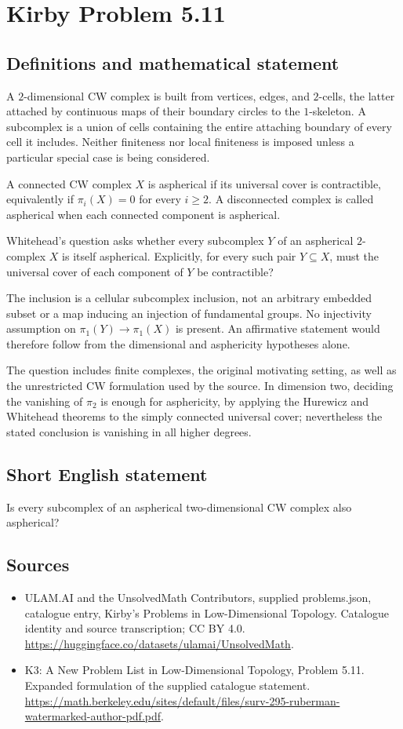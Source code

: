 \documentclass[11pt,a4paper]{article}
\begin{document}
\section*{Kirby Problem 5.11}\label{statement}

\subsection{Definitions and mathematical statement}
A $2$-dimensional CW complex is built from vertices, edges,
and $2$-cells, the latter attached by continuous maps of their
boundary circles to the $1$-skeleton. A subcomplex is a union
of cells containing the entire attaching boundary of every cell
it includes. Neither finiteness nor local finiteness is imposed
unless a particular special case is being considered.

A connected CW complex $X$ is aspherical if its universal
cover is contractible, equivalently if $\pi_i(X)=0$ for every
$i\ge2$. A disconnected complex is called aspherical when
each connected component is aspherical.

Whitehead's question asks whether every subcomplex $Y$ of an
aspherical $2$-complex $X$ is itself aspherical. Explicitly,
for every such pair $Y\subseteq X$, must the universal cover
of each component of $Y$ be contractible?

The inclusion is a cellular subcomplex inclusion, not an
arbitrary embedded subset or a map inducing an injection of
fundamental groups. No injectivity assumption on
$\pi_1(Y)\to\pi_1(X)$ is present. An affirmative statement
would therefore follow from the dimensional and asphericity
hypotheses alone.

The question includes finite complexes, the original motivating
setting, as well as the unrestricted CW formulation used by
the source. In dimension two, deciding the vanishing of
$\pi_2$ is enough for asphericity, by applying the Hurewicz
and Whitehead theorems to the simply connected universal
cover; nevertheless the stated conclusion is vanishing in
all higher degrees.
\subsection{Short English statement}
Is every subcomplex of an aspherical two-dimensional CW complex also aspherical?
\subsection{Sources}
\begin{itemize}
\item[S1] ULAM.AI and the UnsolvedMath Contributors, supplied problems.json, catalogue entry, Kirby's Problems in Low-Dimensional Topology. Catalogue identity and source transcription; CC BY 4.0.
\url{https://huggingface.co/datasets/ulamai/UnsolvedMath}.
\item[S2] K3: A New Problem List in Low-Dimensional Topology, Problem 5.11. Expanded formulation of the supplied catalogue statement.
\url{https://math.berkeley.edu/sites/default/files/surv-295-ruberman-watermarked-author-pdf.pdf}.
\end{itemize}
\end{document}
